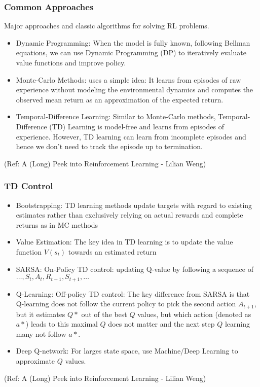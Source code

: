 \begin{frame}[fragile]\frametitle{Common Approaches}

Major approaches and classic algorithms for solving RL
problems. 

\begin{itemize}
\item Dynamic Programming: When the model is fully known, following Bellman equations, we can use Dynamic Programming (DP)
to iteratively evaluate value functions and improve policy.
\item Monte-Carlo Methods:  uses a simple idea: It learns
from episodes of raw experience without modeling the environmental dynamics and computes the
observed mean return as an approximation of the expected return.
\item Temporal-Difference Learning: Similar to Monte-Carlo methods, Temporal-Difference (TD) Learning is model-free and learns from
episodes of experience. However, TD learning can learn from incomplete episodes and hence we
don’t need to track the episode up to termination.

\end{itemize}


{\tiny (Ref: A (Long) Peek into Reinforcement Learning - Lilian Weng)}


\end{frame}

\begin{frame}[fragile]\frametitle{TD Control}

\begin{itemize}
\item Bootstrapping: TD learning methods update targets with regard to existing estimates rather than exclusively relying
on actual rewards and complete returns as in MC methods
\item Value Estimation: The key idea in TD learning is to update the value function $V(s_t)$ towards an estimated return
\item SARSA: On-Policy TD control:  updating Q-value by following a sequence of $\ldots , S_t,A_t,R_{t+1}, S_{t+1},\ldots$
\item Q-Learning: Off-policy TD control: The key difference from SARSA is that Q-learning does not follow the current policy to pick the
second action $A_{t+1}$, but it estimates $Q*$ out of the best $Q$ values, but which action (denoted as $a*$) leads to this maximal $Q$ does not matter  and the next step $Q$ learning many not follow $a*$.
\item Deep Q-network: For larges state space, use Machine/Deep Learning to approximate $Q$ values.
\end{itemize}




{\tiny (Ref: A (Long) Peek into Reinforcement Learning - Lilian Weng)}


\end{frame}


